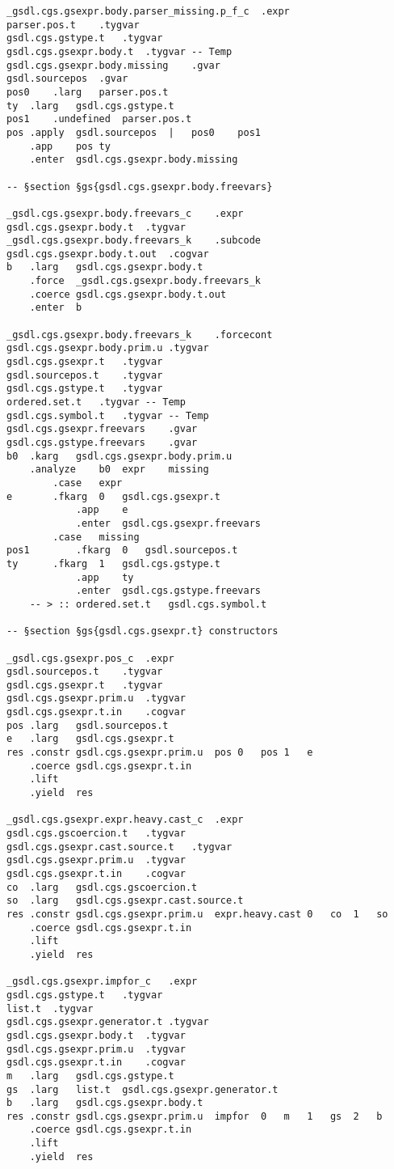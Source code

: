 \documentclass{report}
\begin{document}
\begin{verbatim}
_gsdl.cgs.gsexpr.body.parser_missing.p_f_c	.expr
parser.pos.t	.tygvar
gsdl.cgs.gstype.t	.tygvar
gsdl.cgs.gsexpr.body.t	.tygvar	-- Temp
gsdl.cgs.gsexpr.body.missing	.gvar
gsdl.sourcepos	.gvar
pos0	.larg	parser.pos.t
ty	.larg	gsdl.cgs.gstype.t
pos1	.undefined	parser.pos.t
pos	.apply	gsdl.sourcepos	|	pos0	pos1
	.app	pos	ty
	.enter	gsdl.cgs.gsexpr.body.missing

-- §section §gs{gsdl.cgs.gsexpr.body.freevars}

_gsdl.cgs.gsexpr.body.freevars_c	.expr
gsdl.cgs.gsexpr.body.t	.tygvar
_gsdl.cgs.gsexpr.body.freevars_k	.subcode
gsdl.cgs.gsexpr.body.t.out	.cogvar
b	.larg	gsdl.cgs.gsexpr.body.t
	.force	_gsdl.cgs.gsexpr.body.freevars_k
	.coerce	gsdl.cgs.gsexpr.body.t.out
	.enter	b

_gsdl.cgs.gsexpr.body.freevars_k	.forcecont
gsdl.cgs.gsexpr.body.prim.u	.tygvar
gsdl.cgs.gsexpr.t	.tygvar
gsdl.sourcepos.t	.tygvar
gsdl.cgs.gstype.t	.tygvar
ordered.set.t	.tygvar	-- Temp
gsdl.cgs.symbol.t	.tygvar	-- Temp
gsdl.cgs.gsexpr.freevars	.gvar
gsdl.cgs.gstype.freevars	.gvar
b0	.karg	gsdl.cgs.gsexpr.body.prim.u
	.analyze	b0	expr	missing
		.case	expr
e		.fkarg	0	gsdl.cgs.gsexpr.t
			.app	e
			.enter	gsdl.cgs.gsexpr.freevars
		.case	missing
pos1		.fkarg	0	gsdl.sourcepos.t
ty		.fkarg	1	gsdl.cgs.gstype.t
			.app	ty
			.enter	gsdl.cgs.gstype.freevars
	-- > :: ordered.set.t	gsdl.cgs.symbol.t

-- §section §gs{gsdl.cgs.gsexpr.t} constructors

_gsdl.cgs.gsexpr.pos_c	.expr
gsdl.sourcepos.t	.tygvar
gsdl.cgs.gsexpr.t	.tygvar
gsdl.cgs.gsexpr.prim.u	.tygvar
gsdl.cgs.gsexpr.t.in	.cogvar
pos	.larg	gsdl.sourcepos.t
e	.larg	gsdl.cgs.gsexpr.t
res	.constr	gsdl.cgs.gsexpr.prim.u	pos	0	pos	1	e
	.coerce	gsdl.cgs.gsexpr.t.in
	.lift
	.yield	res

_gsdl.cgs.gsexpr.expr.heavy.cast_c	.expr
gsdl.cgs.gscoercion.t	.tygvar
gsdl.cgs.gsexpr.cast.source.t	.tygvar
gsdl.cgs.gsexpr.prim.u	.tygvar
gsdl.cgs.gsexpr.t.in	.cogvar
co	.larg	gsdl.cgs.gscoercion.t
so	.larg	gsdl.cgs.gsexpr.cast.source.t
res	.constr	gsdl.cgs.gsexpr.prim.u	expr.heavy.cast	0	co	1	so
	.coerce	gsdl.cgs.gsexpr.t.in
	.lift
	.yield	res

_gsdl.cgs.gsexpr.impfor_c	.expr
gsdl.cgs.gstype.t	.tygvar
list.t	.tygvar
gsdl.cgs.gsexpr.generator.t	.tygvar
gsdl.cgs.gsexpr.body.t	.tygvar
gsdl.cgs.gsexpr.prim.u	.tygvar
gsdl.cgs.gsexpr.t.in	.cogvar
m	.larg	gsdl.cgs.gstype.t
gs	.larg	list.t	gsdl.cgs.gsexpr.generator.t
b	.larg	gsdl.cgs.gsexpr.body.t
res	.constr	gsdl.cgs.gsexpr.prim.u	impfor	0	m	1	gs	2	b
	.coerce	gsdl.cgs.gsexpr.t.in
	.lift
	.yield	res


\end{verbatim}
\end{document}

